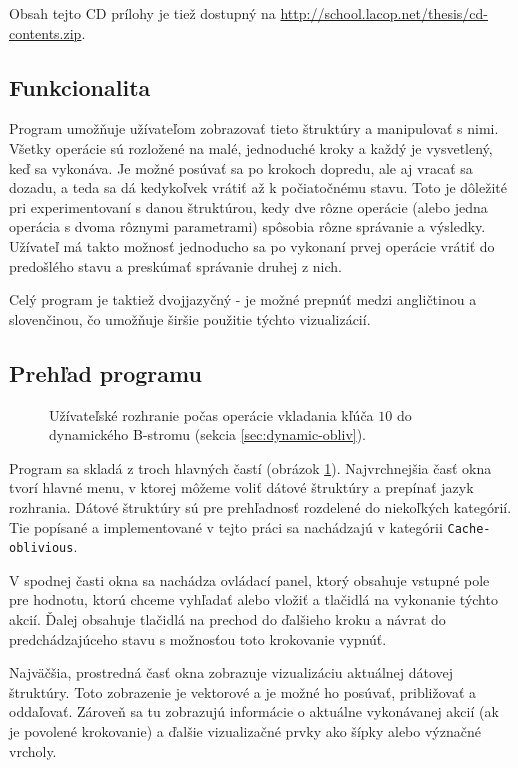 Obsah tejto CD prílohy je tiež dostupný na \url{http://school.lacop.net/thesis/cd-contents.zip}.

\subsection{Funkcionalita}
Program umožňuje užívateľom zobrazovať tieto štruktúry a manipulovať s nimi. Všetky operácie sú rozložené na malé, jednoduché kroky a každý je vysvetlený, keď sa vykonáva. Je možné posúvať sa po krokoch dopredu, ale aj vracať sa dozadu, a teda sa dá kedykoľvek vrátiť až k počiatočnému stavu. Toto je dôležité pri experimentovaní s danou štruktúrou, kedy dve rôzne operácie (alebo jedna operácia s dvoma rôznymi parametrami) spôsobia rôzne správanie a výsledky. Užívateľ má takto možnosť jednoducho sa po vykonaní prvej operácie vrátiť do predošlého stavu a preskúmať správanie druhej z nich.

Celý program je taktiež dvojjazyčný - je možné prepnúť medzi angličtinou a slovenčinou, čo umožňuje širšie použitie týchto vizualizácií.

\subsection{Prehľad programu}
\begin{figure}
    \centering
    \resizebox{0.9\textwidth}{!}{%
            
    }
    \caption[Užívateľské rozhranie]{Užívateľské rozhranie počas operácie vkladania kľúča $10$ do dynamického \obliv B-stromu (sekcia \ref{sec:dynamic-obliv}).}
    \label{fig:ss_overview}
\end{figure}

Program sa skladá z troch hlavných častí (obrázok \ref{fig:ss_overview}). Najvrchnejšia časť okna tvorí hlavné menu, v ktorej môžeme voliť dátové štruktúry a prepínať jazyk rozhrania. Dátové štruktúry sú pre prehľadnosť rozdelené do niekoľkých kategórií. Tie popísané a implementované v tejto práci sa nachádzajú v kategórii \texttt{Cache-oblivious}.

V spodnej časti okna sa nachádza ovládací panel, ktorý obsahuje vstupné pole pre hodnotu, ktorú chceme vyhľadať alebo vložiť a tlačidlá na vykonanie týchto akcií. Ďalej obsahuje tlačidlá na prechod do ďalšieho kroku a návrat do predchádzajúceho stavu s možnosťou toto krokovanie vypnúť.

Najväčšia, prostredná časť okna zobrazuje vizualizáciu aktuálnej dátovej štruktúry. Toto zobrazenie je vektorové a je možné ho posúvať, približovať a oddaľovať. Zároveň sa tu zobrazujú informácie o aktuálne vykonávanej akcií (ak je povolené krokovanie) a ďalšie vizualizačné prvky ako šípky alebo význačné vrcholy.

